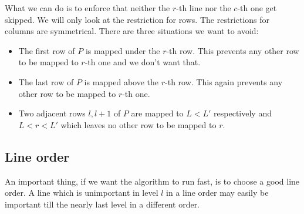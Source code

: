 What we can do is to enforce that neither the $r$-th line nor the $c$-th one get skipped. We will only look at the restriction for rows. The restrictions for columns are symmetrical. There are three situations we want to avoid:
\begin{itemize}
\item The first row of $P$ is mapped under the $r$-th row. This prevents any other row to be mapped to $r$-th one and we don't want that.
\item The last row of $P$ is mapped above the $r$-th row. This again prevents any other row to be mapped to $r$-th one.
\item Two adjacent rows $l,l+1$ of $P$ are mapped to $L<L'$ respectively and $L<r<L'$ which leaves no other row to be mapped to $r$.
\end{itemize}

\subsection{Line order}
An important thing, if we want the algorithm to run fast, is to choose a good line order. A line which is unimportant in level $l$ in a line order may easily be important till the nearly last level in a different order.

